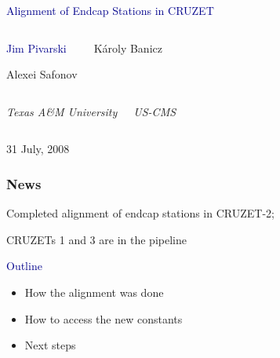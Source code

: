\documentclass[compress]{beamer}
\begin{document}
\begin{frame}
\vfill
\begin{center}
\textcolor{darkblue}{\Large Alignment of Endcap Stations in CRUZET}

\vfill
\begin{columns}
\begin{center}
\large
\textcolor{darkblue}{Jim Pivarski}

\vspace{0.2 cm}
Alexei Safonov
\end{center}

\begin{center}
\large
K\'aroly Banicz
\end{center}
\end{columns}

\begin{columns}
\begin{center}
\scriptsize
{\it Texas A\&M University}
\end{center}
\begin{center}
\scriptsize
{\it US-CMS}
\end{center}
\end{columns}

\vfill
31 July, 2008

\end{center}
\end{frame}


\begin{frame}
\frametitle{News}

Completed alignment of endcap stations in CRUZET-2;

CRUZETs 1 and 3 are in the pipeline

\vfill
\hspace{-0.83 cm} \textcolor{darkblue}{\Large Outline}

\vspace{0.2 cm}
\begin{itemize}\setlength{\itemsep}{0.5 cm}
\item How the alignment was done
\item How to access the new constants
\item Next steps
\end{itemize}
\end{frame}
\end{document}
